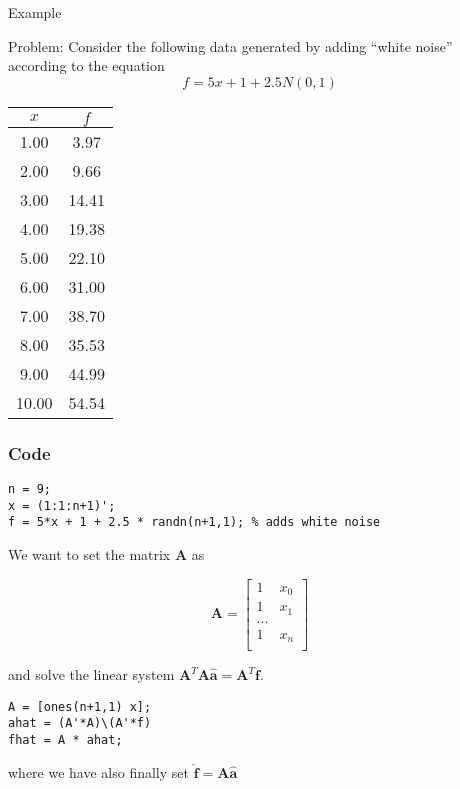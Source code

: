 \documentclass[xcolor=dvipsnames,11pt]{beamer}
\newcommand{\highlight}[1]{\textcolor{BrickRed}{#1}}
\begin{document}
\begin{frame}{Example}

\highlight{Problem}: Consider the following data generated by adding ``white noise'' according to the equation $$f = 5x + 1 + 2.5 N(0,1)$$

\begin{center}

\begin{tabular}{|c|c|}
\hline 
$x$ & $f$ \\
\hline 
1.00 &   3.97 \\ 
2.00 &   9.66 \\ 
3.00 &  14.41 \\ 
4.00 &  19.38 \\ 
5.00 &  22.10 \\ 
6.00 &  31.00 \\ 
7.00 &  38.70 \\ 
8.00 &  35.53 \\ 
9.00 &  44.99 \\ 
10.00 &  54.54 \\ 
\hline 
\end{tabular} 

\end{center}
\end{frame}

\begin{frame}[fragile]
\frametitle{Code}
\begin{lstlisting}
n = 9;
x = (1:1:n+1)';
f = 5*x + 1 + 2.5 * randn(n+1,1); % adds white noise
\end{lstlisting}

We want to set the matrix $\mathbf{A}$ as

$$\mathbf{A} = \begin{bmatrix}
1 & x_0 \\
1 & x_1 \\
... &   \\
1 & x_{n} \\
\end{bmatrix}$$

and solve the linear system  $\mathbf{A}^T \mathbf{A \hat{a}} = \mathbf{A}^T \mathbf{f}$.

\begin{lstlisting}
A = [ones(n+1,1) x];
ahat = (A'*A)\(A'*f)
fhat = A * ahat;
\end{lstlisting}

where we have also finally set $\mathbf{\hat{f}} = \mathbf{A \hat{a}}$
\end{frame}
\end{document}
